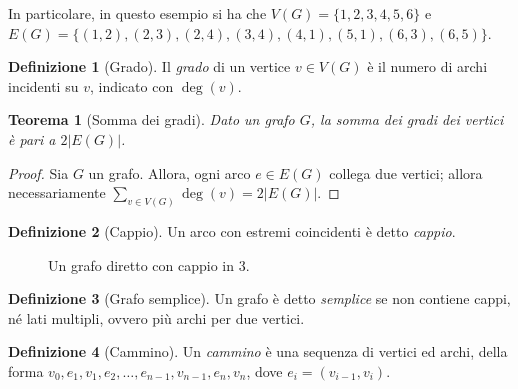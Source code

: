 \documentclass[14pt]{extreport}
\newtheorem{theorem}{Teorema}[section]
\theoremstyle{definition}
\newtheorem{definition}{Definizione}[section]
\theoremstyle{remark}
\begin{document}
In particolare, in questo esempio si ha che $V(G) = \{1, 2, 3, 4, 5, 6\}$ e $E(G) = \{(1, 2), (2, 3), (2, 4), (3, 4), (4, 1), (5, 1), (6, 3), (6, 5)\}$.

\begin{definition}[Grado]
    Il \textit{grado} di un vertice $v \in V(G)$ è il numero di archi incidenti su $v$, indicato con $\deg(v)$.
\end{definition}

\begin{theorem}[Somma dei gradi]
    Dato un grafo $G$, la somma dei gradi dei vertici è pari a $2 |E(G)|$.
\end{theorem}

\begin{proof}
    Sia $G$ un grafo. Allora, ogni arco $e \in E(G)$ collega due vertici; allora necessariamente $\displaystyle \sum_{v \in V(G)}{\deg(v)} = 2 |E(G)|$.
\end{proof}

\begin{definition}[Cappio]
    Un arco con estremi coincidenti è detto \textit{cappio}.
\end{definition}

\begin{figure}[h]
    \centering
    \caption{Un grafo diretto con cappio in 3.}
\end{figure}

\begin{definition}[Grafo semplice]
    Un grafo è detto \textit{semplice} se non contiene cappi, né lati multipli, ovvero più archi per due vertici.
\end{definition}

\begin{definition}[Cammino]
    Un \textit{cammino} è una sequenza di vertici ed archi, della forma $v_0, e_1, v_1, e_2, \ldots , e_{n - 1}, v_{n - 1}, e_n, v_n$, dove $e_i=(v_{i - 1}, v_i)$.
\end{definition}
\end{document}
